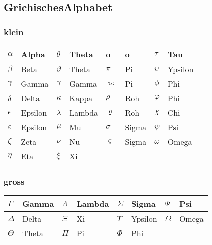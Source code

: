 \subsection{GrichischesAlphabet}
\begin{multicols}{2}
	\subsubsection{klein}
	\begin{tabular}{ |l|l|l|l|l|l|l|l|}
		\hline
		$\alpha$&Alpha&$\theta$&Theta&o&o&$\tau$&Tau\\
		\hline
		$\beta$&Beta&$\vartheta$&Theta&$\pi$&Pi&$\upsilon$&Ypsilon\\
		\hline
		$\gamma$&Gamma&$\gamma$&Gamma&$\varpi$&Pi&$\phi$&Phi\\
		\hline
		$\delta$&Delta&$\kappa$&Kappa&$\rho$&Roh&$\varphi$&Phi\\
		\hline
		$\epsilon$&Epsilon&$\lambda$&Lambda&$\varrho$&Roh&$\chi$&Chi\\
		\hline
		$\varepsilon$&Epsilon&$\mu$&Mu&$\sigma$&Sigma&$\psi$&Psi\\
		\hline
		$\zeta$&Zeta&$\nu$&Nu&$\varsigma$&Sigma&$\omega$&Omega\\
		\hline
		$\eta$&Eta&$\xi$&Xi&&&&\\
		\hline
	\end{tabular}
	\columnbreak
	
	\subsubsection{gross}
	\begin{tabular}{|l|l|l|l|l|l|l|l|}
		\hline
		$\Gamma$&Gamma&$\Lambda$&Lambda&$\Sigma$&Sigma&$\Psi$&Psi\\
		\hline
		$\Delta$&Delta&$\Xi$&Xi&$\Upsilon$&Ypsilon&$\Omega$&Omega\\
		\hline
		$\Theta$&Theta&$\Pi$&Pi&$\Phi$&Phi&&\\
		\hline
	\end{tabular}
\end{multicols}